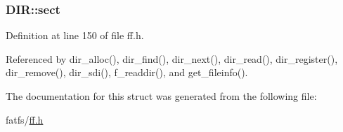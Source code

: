 \subsubsection[{\texorpdfstring{sect}{sect}}]{ D\+I\+R\+::sect}\hypertarget{structDIR_ad01fcc812ed0dad11a593574336adc9e}{}\label{structDIR_ad01fcc812ed0dad11a593574336adc9e}


Definition at line 150 of file ff.\+h.



Referenced by dir\+\_\+alloc(), dir\+\_\+find(), dir\+\_\+next(), dir\+\_\+read(), dir\+\_\+register(), dir\+\_\+remove(), dir\+\_\+sdi(), f\+\_\+readdir(), and get\+\_\+fileinfo().



The documentation for this struct was generated from the following file\+:\begin{DoxyCompactItemize}
\item 
fatfs/\hyperlink{ff_8h}{ff.\+h}\end{DoxyCompactItemize}

